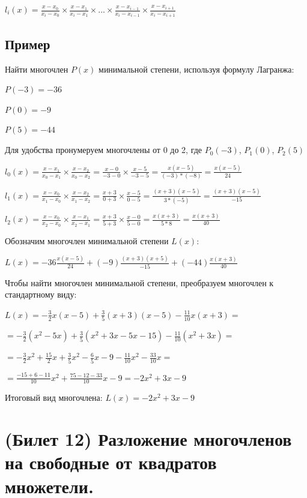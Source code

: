 \documentclass[12pt]{article}
\begin{document}
$l_i(x) = \frac{x-x_0}{x_i-x_0} \times \frac{x-x_1}{x_i-x_1} \times ... \times \frac{x-x_{i-1}}{x_i-x_{i-1}} \times \frac{x-x_{i+1}}{x_i-x_{i+1}}$

\subsection{Пример}
Найти многочлен $P(x)$ минимальной степени, используя формулу Лагранжа:

$P(-3) = -36$

$P(0) = -9$

$P(5) = -44$

Для удобства пронумеруем многочлены от 0 до 2, где $P_0(-3)$, $P_1(0)$, $P_2(5)$

$l_0(x) = \frac{x-x_1}{x_0-x_1} \times \frac{x-x_2}{x_0-x_2} = \frac{x-0}{-3-0} \times \frac{x-5}{-3-5} = \frac{x(x-5)}{(-3)*(-8)} = \frac{x(x-5)}{24}$

$l_1(x) = \frac{x-x_0}{x_1-x_0} \times \frac{x-x_2}{x_1-x_2} = \frac{x+3}{0+3} \times \frac{x-5}{0-5} = \frac{(x+3)(x-5)}{3*(-5)} = \frac{(x+3)(x-5)}{-15}$

$l_2(x) = \frac{x-x_0}{x_2-x_0} \times \frac{x-x_1}{x_2-x_1} = \frac{x+3}{5+3} \times \frac{x-0}{5-0} = \frac{x(x+3)}{5*8} = \frac{x(x+3)}{40}$

Обозначим многочлен минимальной степени $L(x)$:

$L(x) = -36\frac{x(x-5)}{24} + (-9)\frac{(x+3)(x+5)}{-15} + (-44)\frac{x(x+3)}{40}$

Чтобы найти многочлен минимальной степени, преобразуем многочлен к стандартному виду:

$L(x) = -\frac{3}{2}x(x-5) + \frac{3}{5}(x+3)(x-5) - \frac{11}{10}x(x+3) =$

$= -\frac{3}{2}(x^2-5x) + \frac{3}{5}(x^2+3x-5x-15) - \frac{11}{10}(x^2+3x) =$

$= -\frac{3}{2}x^2 + \frac{15}{2}x + \frac{3}{5}x^2 - \frac{6}{5}x - 9 - \frac{11}{10}x^2 - \frac{33}{10}x =$

$= \frac{-15+6-11}{10}x^2 + \frac{75-12-33}{10}x - 9 = -2x^2 + 3x - 9$

Итоговый вид многочлена: $L(x) = -2x^2 + 3x - 9$

\setcounter{section}{11}

\section{(Билет 12) Разложение многочленов на свободные от квадратов множетели.}
\end{document}

